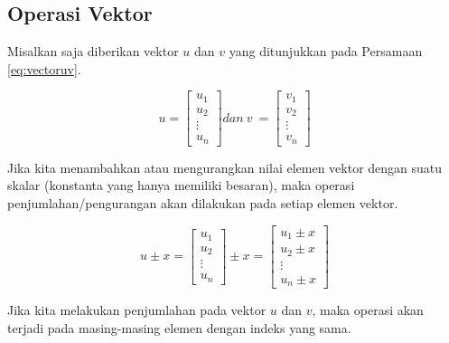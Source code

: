 \documentclass[]{book}
\theoremstyle{definition}
\theoremstyle{definition}
\theoremstyle{definition}
\theoremstyle{remark}
\begin{document}
\hypertarget{operasivektor}{%
\subsection{Operasi Vektor}\label{operasivektor}}

Misalkan saja diberikan vektor \(u\) dan \(v\) yang ditunjukkan pada Persamaan \eqref{eq:vectoruv}.

\begin{equation}
u = \begin{bmatrix}
      u_1            \\[0.3em]
      u_2            \\[0.3em]
      \vdots         \\[0.3em] 
      u_n
     \end{bmatrix}
dan\ v\ = \begin{bmatrix}
      v_1            \\[0.3em]
      v_2            \\[0.3em]
      \vdots         \\[0.3em] 
      v_n
     \end{bmatrix}
  \label{eq:vectoruv}
\end{equation}

Jika kita menambahkan atau mengurangkan nilai elemen vektor dengan suatu skalar (konstanta yang hanya memiliki besaran), maka operasi penjumlahan/pengurangan akan dilakukan pada setiap elemen vektor.

\begin{equation}
u \pm x = \begin{bmatrix}
      u_1            \\[0.3em]
      u_2            \\[0.3em]
      \vdots         \\[0.3em] 
      u_n
     \end{bmatrix}
\pm x = \begin{bmatrix}
      u_1 \pm x            \\[0.3em]
      u_2 \pm x           \\[0.3em]
      \vdots         \\[0.3em] 
      u_n \pm x
     \end{bmatrix}
     \label{eq:addvector}
\end{equation}

Jika kita melakukan penjumlahan pada vektor \(u\) dan \(v\), maka operasi akan terjadi pada masing-masing elemen dengan indeks yang sama.
\end{document}
